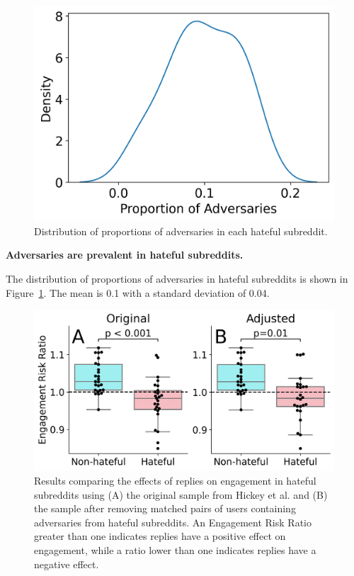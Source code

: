 \documentclass[10pt,twocolumn,letterpaper]{article}
\begin{document}
\begin{figure}
    \centering
    \includegraphics[width=0.9\columnwidth]{adversary_distribution.png}
    \caption{Distribution of proportions of adversaries in each hateful subreddit.}
    \label{fig:adversary_distribution}
\end{figure}

\textbf{Adversaries are prevalent in hateful subreddits.}

The distribution of proportions of adversaries in hateful subreddits is shown in Figure~\ref{fig:adversary_distribution}. The mean is 0.1 with a standard deviation of 0.04.


\begin{figure}
    \centering
    \includegraphics[width=0.9\columnwidth]{adjusted_adversaries.png}
    \caption{Results comparing the effects of replies on engagement in hateful subreddits using (A) the original sample from Hickey et al. and (B) the sample after removing matched pairs of users containing adversaries from hateful subreddits. An Engagement Risk Ratio greater than one indicates replies have a positive effect on engagement, while a ratio lower than one indicates replies have a negative effect.}
    \label{fig:adversary_comparison}
\end{figure}
\end{document}
